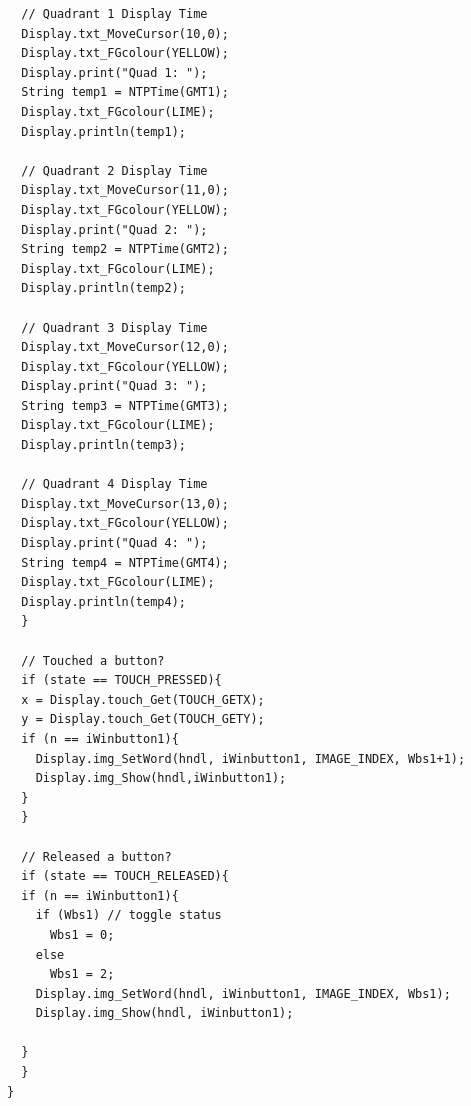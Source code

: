 \documentclass[12pt,a4paper]{report}
\begin{document}
\begin{lstlisting}
  // Quadrant 1 Display Time
  Display.txt_MoveCursor(10,0);
  Display.txt_FGcolour(YELLOW);
  Display.print("Quad 1: ");
  String temp1 = NTPTime(GMT1);
  Display.txt_FGcolour(LIME);
  Display.println(temp1);

  // Quadrant 2 Display Time
  Display.txt_MoveCursor(11,0);
  Display.txt_FGcolour(YELLOW);
  Display.print("Quad 2: ");
  String temp2 = NTPTime(GMT2);
  Display.txt_FGcolour(LIME);
  Display.println(temp2);

  // Quadrant 3 Display Time
  Display.txt_MoveCursor(12,0);
  Display.txt_FGcolour(YELLOW);
  Display.print("Quad 3: ");
  String temp3 = NTPTime(GMT3);
  Display.txt_FGcolour(LIME);
  Display.println(temp3);

  // Quadrant 4 Display Time
  Display.txt_MoveCursor(13,0);
  Display.txt_FGcolour(YELLOW);
  Display.print("Quad 4: ");
  String temp4 = NTPTime(GMT4);
  Display.txt_FGcolour(LIME);
  Display.println(temp4);
  }

  // Touched a button?
  if (state == TOUCH_PRESSED){
  x = Display.touch_Get(TOUCH_GETX);
  y = Display.touch_Get(TOUCH_GETY);
  if (n == iWinbutton1){
    Display.img_SetWord(hndl, iWinbutton1, IMAGE_INDEX, Wbs1+1);
    Display.img_Show(hndl,iWinbutton1);
  }
  }

  // Released a button?
  if (state == TOUCH_RELEASED){
  if (n == iWinbutton1){
    if (Wbs1) // toggle status
      Wbs1 = 0;
    else
      Wbs1 = 2;
    Display.img_SetWord(hndl, iWinbutton1, IMAGE_INDEX, Wbs1);
    Display.img_Show(hndl, iWinbutton1);

  }
  }
}


\end{lstlisting}
\end{document}
